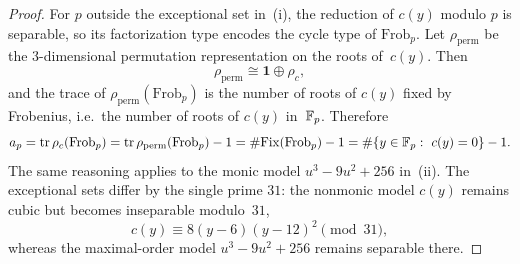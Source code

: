 \begin{proof}
For \(p\) outside the exceptional set in~(i), the reduction of \(c(y)\) modulo \(p\) is separable, so its factorization type encodes the cycle type of \(\mathrm{Frob}_p\). Let \(\rho_{\mathrm{perm}}\) be the \(3\)-dimensional permutation representation on the roots of~\(c(y)\). Then
\[
\rho_{\mathrm{perm}}\cong \mathbf{1}\oplus \rho_c,
\]
and the trace of \(\rho_{\mathrm{perm}}(\mathrm{Frob}_p)\) is the number of roots of \(c(y)\) fixed by Frobenius, i.e.\ the number of roots of \(c(y)\) in~\(\mathbb{F}_p\). Therefore
\[
a_p=\operatorname{tr}\rho_c(\mathrm{Frob}_p)=\operatorname{tr}\rho_{\mathrm{perm}}(\mathrm{Frob}_p)-1
=\#\mathrm{Fix}(\mathrm{Frob}_p)-1
=\#\{y\in \mathbb{F}_p:\ c(y)=0\}-1.
\]
The same reasoning applies to the monic model \(u^3-9u^2+256\) in~(ii). The exceptional sets differ by the single prime \(31\): the nonmonic model \(c(y)\) remains cubic but becomes inseparable modulo~\(31\),
\[
c(y)\equiv 8(y-6)(y-12)^2\pmod{31},
\]
whereas the maximal-order model \(u^3-9u^2+256\) remains separable there.
\end{proof}
